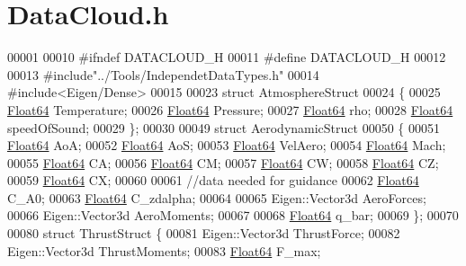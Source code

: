 \hypertarget{_data_cloud_8h_source}{}\section{Data\+Cloud.\+h}
\label{_data_cloud_8h_source}

\begin{DoxyCode}
00001 
00010 \textcolor{preprocessor}{#ifndef DATACLOUD\_H}
00011 \textcolor{preprocessor}{#define DATACLOUD\_H}
00012 
00013 \textcolor{preprocessor}{#include"../Tools/IndependetDataTypes.h"}
00014 \textcolor{preprocessor}{#include<Eigen/Dense>}
00015 
00023 \textcolor{keyword}{struct }AtmosphereStruct
00024 \{
00025     \hyperlink{group___tools_ga3f1431cb9f76da10f59246d1d743dc2c}{Float64}  Temperature;    
00026     \hyperlink{group___tools_ga3f1431cb9f76da10f59246d1d743dc2c}{Float64} Pressure;       
00027     \hyperlink{group___tools_ga3f1431cb9f76da10f59246d1d743dc2c}{Float64}  rho;            
00028     \hyperlink{group___tools_ga3f1431cb9f76da10f59246d1d743dc2c}{Float64} speedOfSound;   
00029 \};
00030 
00049 \textcolor{keyword}{struct }AerodynamicStruct
00050 \{
00051     \hyperlink{group___tools_ga3f1431cb9f76da10f59246d1d743dc2c}{Float64} AoA;     
00052     \hyperlink{group___tools_ga3f1431cb9f76da10f59246d1d743dc2c}{Float64} AoS;
00053     \hyperlink{group___tools_ga3f1431cb9f76da10f59246d1d743dc2c}{Float64} VelAero;
00054     \hyperlink{group___tools_ga3f1431cb9f76da10f59246d1d743dc2c}{Float64} Mach;
00055     \hyperlink{group___tools_ga3f1431cb9f76da10f59246d1d743dc2c}{Float64} CA;
00056     \hyperlink{group___tools_ga3f1431cb9f76da10f59246d1d743dc2c}{Float64} CM;
00057     \hyperlink{group___tools_ga3f1431cb9f76da10f59246d1d743dc2c}{Float64} CW;
00058     \hyperlink{group___tools_ga3f1431cb9f76da10f59246d1d743dc2c}{Float64} CZ;
00059     \hyperlink{group___tools_ga3f1431cb9f76da10f59246d1d743dc2c}{Float64} CX;
00060 
00061     \textcolor{comment}{//data needed for guidance}
00062     \hyperlink{group___tools_ga3f1431cb9f76da10f59246d1d743dc2c}{Float64} C\_A0;
00063     \hyperlink{group___tools_ga3f1431cb9f76da10f59246d1d743dc2c}{Float64} C\_zdalpha;
00064 
00065     Eigen::Vector3d AeroForces;
00066     Eigen::Vector3d AeroMoments;
00067 
00068     \hyperlink{group___tools_ga3f1431cb9f76da10f59246d1d743dc2c}{Float64} q\_bar;
00069 \};
00070 
00080 \textcolor{keyword}{struct }ThrustStruct \{
00081     Eigen::Vector3d ThrustForce;    
00082     Eigen::Vector3d ThrustMoments;  
00083     \hyperlink{group___tools_ga3f1431cb9f76da10f59246d1d743dc2c}{Float64}  F\_max;                  

\end{DoxyCode}
